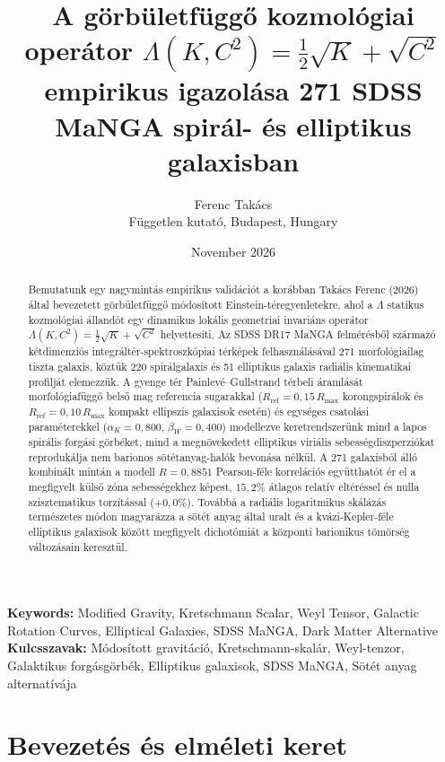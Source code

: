 \documentclass[11pt,a4paper]{article}
\title{\textbf{A görbületfüggő kozmológiai operátor $\Lambda(K, C^2) = \frac{1}{2}\sqrt{K} + \sqrt{C^2}$ empirikus igazolása 271 SDSS MaNGA spirál- és elliptikus galaxisban}}
\author{Ferenc Tak\'acs \\
\small Független kutató, Budapest, Hungary}
\date{November 2026}
\begin{document}
\maketitle

\begin{abstract}
Bemutatunk egy nagymintás empirikus validációt a korábban Takács Ferenc (2026) által bevezetett görbületfüggő módosított Einstein-téregyenletekre, ahol a $\Lambda$ statikus kozmológiai állandót egy dinamikus lokális geometriai invariáns operátor $\Lambda(K, C^2) = \frac{1}{2}\sqrt{K} + \sqrt{C^2}$ helyettesíti. Az SDSS DR17 MaNGA felmérésből származó kétdimenziós integráltér-spektroszkópiai térképek felhasználásával 271 morfológiailag tiszta galaxis, köztük 220 spirálgalaxis és 51 elliptikus galaxis radiális kinematikai profilját elemezzük. A gyenge tér Painlev\'e--Gullstrand térbeli áramlását morfológiafüggő belső mag referencia sugarakkal ($R_{\mathrm{ref}} = 0,15\,R_{\max}$ korongspirálok és $R_{\mathrm{ref}} = 0,10\,R_{\max}$ kompakt ellipszis galaxisok esetén) és egységes csatolási paraméterekkel ($\alpha_K = 0,800$, $\beta_W = 0,400$) modellezve keretrendszerünk mind a lapos spirális forgási görbéket, mind a megnövekedett elliptikus viriális sebességdiszperziókat reprodukálja nem barionos sötétanyag-halók bevonása nélkül. A 271 galaxisból álló kombinált mintán a modell $R = 0,8851$ Pearson-féle korrelációs együtthatót ér el a megfigyelt külső zóna sebességekhez képest, $15,2\%$ átlagos relatív eltéréssel és nulla szisztematikus torzítással ($+0,0\%$). Továbbá a radiális logaritmikus skálázás természetes módon magyarázza a sötét anyag által uralt és a kvázi-Kepler-féle elliptikus galaxisok között megfigyelt dichotómiát a központi barionikus tömörség változásain keresztül.

\end{abstract}

\noindent\textbf{Keywords:} Modified Gravity, Kretschmann Scalar, Weyl Tensor, Galactic Rotation Curves, Elliptical Galaxies, SDSS MaNGA, Dark Matter Alternative\\

\noindent\textbf{Kulcsszavak:} Módosított gravitáció, Kretschmann-skalár, Weyl-tenzor, Galaktikus forgásgörbék, Elliptikus galaxisok, SDSS MaNGA, Sötét anyag alternatívája

\section{Bevezetés és elméleti keret}
\end{document}
